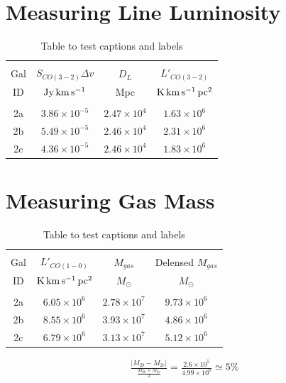 \documentclass[11pt]{article}
\begin{document}
\section*{Measuring Line Luminosity}

\begin{table}[!htbp]
\centering
\begin{tabular}{cccc}
\hline \\[-0.25cm]
Gal & $S_{CO(3-2)}\Delta v$ & $D_L$ & $L'_{CO(3-2)}$ \\
ID  & $\rm{Jy\,km\,s^{-1}}$ & Mpc   & $\rm{K\,km\,s^{-1}\,pc^2}$ \\[0.1cm]
\hline \\[-0.25cm]
2a & $3.86\times 10^{-5}$ & $2.47\times 10^{4}$ & $1.63\times 10^{6}$ \\
2b & $5.49\times 10^{-5}$ & $2.46\times 10^{4}$ & $2.31\times 10^{6}$ \\
2c & $4.36\times 10^{-5}$ & $2.46\times 10^{4}$ & $1.83\times 10^{6}$ \\
\hline
\end{tabular}
\caption{Table to test captions and labels}
\label{table:2}
\end{table}

\section*{Measuring Gas Mass}

\begin{table}[!htbp]
\centering
\begin{tabular}{cccc}
\hline \\[-0.25cm]
Gal & $L'_{CO(1-0)}$             & $M_{gas}$ & Delensed $M_{gas}$ \\
ID  & $\rm{K\,km\,s^{-1}\,pc^2}$ & $M_\odot$ & $M_\odot$          \\[0.1cm]
\hline \\[-0.25cm]
2a & $6.05\times 10^{6}$ & $2.78\times 10^{7}$ & $9.73\times 10^{6}$ \\
2b & $8.55\times 10^{6}$ & $3.93\times 10^{7}$ & $4.86\times 10^{6}$ \\
2c & $6.79\times 10^{6}$ & $3.13\times 10^{7}$ & $5.12\times 10^{6}$ \\
\hline
\end{tabular}
\caption{Table to test captions and labels}
\label{table:3}
\end{table}

\begin{align*}
    \frac{|M_{2b} - M_{2c}|}{\frac{M_{2b}+M_{2c}}{2}} = \frac{2.6\times 10^{5}}{4.99\times 10^{6}} \simeq 5\%
\end{align*}
\end{document}
